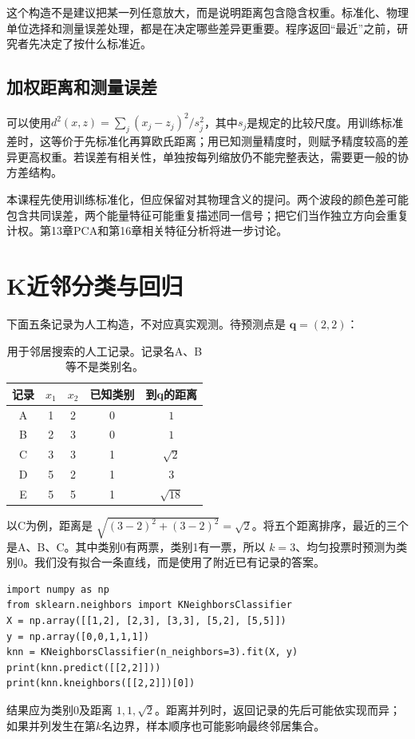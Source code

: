 这个构造不是建议把某一列任意放大，而是说明距离包含隐含权重。标准化、物理单位选择和测量误差处理，都是在决定哪些差异更重要。程序返回“最近”之前，研究者先决定了按什么标准近。

\subsection{加权距离和测量误差}
可以使用$d^2(x,z)=\sum_j (x_j-z_j)^2/s_j^2$，其中$s_j$是规定的比较尺度。用训练标准差时，这等价于先标准化再算欧氏距离；用已知测量精度时，则赋予精度较高的差异更高权重。若误差有相关性，单独按每列缩放仍不能完整表达，需要更一般的协方差结构。

本课程先使用训练标准化，但应保留对其物理含义的提问。两个波段的颜色差可能包含共同误差，两个能量特征可能重复描述同一信号；把它们当作独立方向会重复计权。第13章PCA和第16章相关特征分析将进一步讨论。

\section{K近邻分类与回归}

下面五条记录为人工构造，不对应真实观测。待预测点是 $\mathbf q=(2,2)$：
\begin{table}[htbp]\centering
\begin{tabular}{ccccc}\toprule
记录 & $x_1$ & $x_2$ & 已知类别 & 到$\mathbf q$的距离\\\midrule
A & 1 & 2 & 0 & $1$\\
B & 2 & 3 & 0 & $1$\\
C & 3 & 3 & 1 & $\sqrt2$\\
D & 5 & 2 & 1 & $3$\\
E & 5 & 5 & 1 & $\sqrt{18}$\\\bottomrule
\end{tabular}
\caption{用于邻居搜索的人工记录。记录名A、B等不是类别名。}
\end{table}
以C为例，距离是 $\sqrt{(3-2)^2+(3-2)^2}=\sqrt2$。将五个距离排序，最近的三个是A、B、C。其中类别0有两票，类别1有一票，所以 $k=3$、均匀投票时预测为类别0。我们没有拟合一条直线，而是使用了附近已有记录的答案。

\begin{lstlisting}[caption={核对三近邻的预测}]
import numpy as np
from sklearn.neighbors import KNeighborsClassifier
X = np.array([[1,2], [2,3], [3,3], [5,2], [5,5]])
y = np.array([0,0,1,1,1])
knn = KNeighborsClassifier(n_neighbors=3).fit(X, y)
print(knn.predict([[2,2]]))
print(knn.kneighbors([[2,2]])[0])
\end{lstlisting}
结果应为类别0及距离 $1,1,\sqrt2$。距离并列时，返回记录的先后可能依实现而异；如果并列发生在第$k$名边界，样本顺序也可能影响最终邻居集合。

